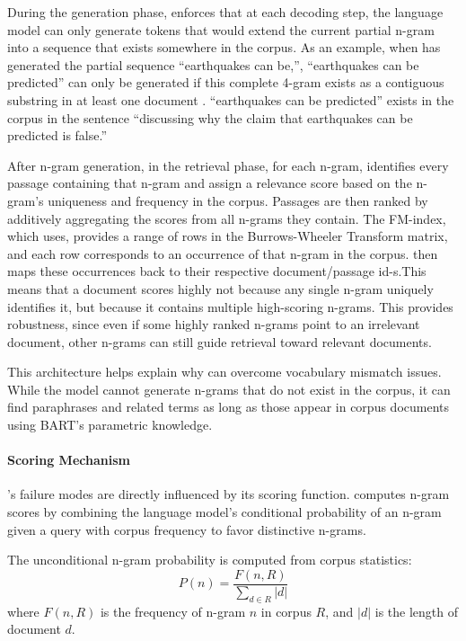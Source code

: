During the generation phase,  enforces that at each decoding step, the language model can only generate tokens that would extend the current partial n-gram into a sequence that exists somewhere in the corpus. As an example, when  has generated the partial sequence ``earthquakes can be,'', ``earthquakes can be predicted'' can only be generated if this complete 4-gram exists as a contiguous substring in at least one document \cite{michele-bevilacqua-autoregressive-search}. ``earthquakes can be predicted'' exists in the corpus in the sentence ``discussing why the claim that earthquakes can be predicted is false.''

After n-gram generation, in the retrieval phase, for each n-gram,  identifies every passage containing that n-gram and assign a relevance score based on the n-gram's uniqueness and frequency in the corpus.
Passages are then ranked by additively aggregating the scores from all n-grams they contain. The FM-index, which  uses, provides a range of rows in the Burrows-Wheeler Transform matrix, and each row corresponds to an occurrence of that n-gram in the corpus. then maps these occurrences back to their respective document/passage id-s.This means that a document scores highly not because any single n-gram uniquely identifies it, but because it contains multiple high-scoring n-grams. This provides robustness, since even if some highly ranked n-grams point to an irrelevant document, other n-grams can still guide retrieval toward relevant documents. %

This architecture helps explain why  can overcome vocabulary mismatch issues. While the model cannot generate n-grams that do not exist in the corpus, it can find paraphrases and related terms as long as those appear in corpus documents using BART's parametric knowledge.

\paragraph{Scoring Mechanism}
\label{par:scormech}
's failure modes are directly influenced by its scoring function.  computes n-gram scores by combining the language model's conditional probability of an n-gram given a query with corpus frequency to favor distinctive n-grams.

The unconditional n-gram probability is computed from corpus statistics:
\begin{equation}
    P(n) = \frac{F(n, R)}{\sum_{d \in R} |d|}
    \label{eq:unconditional-prob}
\end{equation}
where $F(n, R)$ is the frequency of n-gram $n$ in corpus $R$, and $|d|$ is the length of document $d$.

